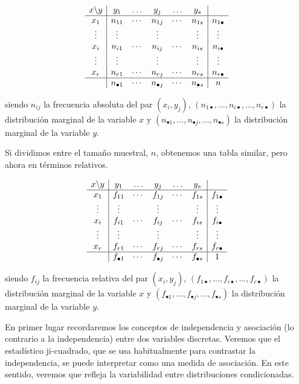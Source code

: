\documentclass[
  a4paper,
  oneside]{scrbook}
\theoremstyle{definition}
\theoremstyle{definition}
\theoremstyle{definition}
\theoremstyle{definition}
\theoremstyle{remark}
\begin{document}
\[\begin{array}{c|ccccc|c}
x\backslash y & y_1 & \ldots & y_j & \ldots & y_s & \\
\hline x_1 & n_{11} & \cdots & n_{1j} & \cdots & n_{1s} & n_{1\bullet} \\
\vdots & \vdots & & \vdots & & \vdots &\vdots \\
x_i & n_{i1} & \cdots & n_{ij} & \cdots & n_{is} & n_{i\bullet} \\
\vdots & \vdots & & \vdots & & \vdots &\vdots \\
x_r & n_{r1} & \cdots & n_{rj} & \cdots & n_{rs} & n_{r\bullet} \\
\hline & n_{\bullet 1} & \cdots & n_{\bullet j} & \cdots & n_{\bullet s} & n \\
\end{array}\]

siendo \(n_{ij}\) la frecuencia absoluta del par \((x_i,y_j)\),
\((n_{1\bullet},\ldots,n_{i\bullet},\ldots,n_{r\bullet})\) la distribución
marginal de la variable \(x\) y
\((n_{\bullet 1},\ldots,n_{\bullet j},\ldots,n_{\bullet s})\) la
distribución marginal de la variable \(y\).

Si dividimos entre el tamaño muestral, \(n\), obtenemos una tabla similar,
pero ahora en términos relativos.

\[\begin{array}{c|ccccc|c}
x\backslash y & y_1 & \ldots & y_j & \ldots & y_s & \\
\hline x_1 & f_{11} & \cdots & f_{1j} & \cdots & f_{1s} & f_{1\bullet} \\
\vdots & \vdots & & \vdots & & \vdots &\vdots \\
x_i & f_{i1} & \cdots & f_{ij} & \cdots & f_{is} & f_{i\bullet} \\
\vdots & \vdots & & \vdots & & \vdots &\vdots \\
x_r & f_{r1} & \cdots & f_{rj} & \cdots & f_{rs} & f_{r\bullet} \\
\hline & f_{\bullet 1} & \cdots & f_{\bullet j} & \cdots & f_{\bullet s} & 1 \\
\end{array}\]

siendo \(f_{ij}\) la frecuencia relativa del par \((x_i,y_j)\),
\((f_{1\bullet},\ldots,f_{i\bullet},\ldots,f_{r\bullet})\) la distribución
marginal de la variable \(x\) y
\((f_{\bullet 1},\ldots,f_{\bullet j},\ldots,f_{\bullet s})\) la
distribución marginal de la variable \(y\).

En primer lugar recordaremos los conceptos de independencia y asociación
(lo contrario a la independencia) entre dos variables discretas. Veremos
que el estadístico ji-cuadrado, que se usa habitualmente para contrastar
la independencia, se puede interpretar como una medida de asociación. En
este sentido, veremos que refleja la variabilidad entre distribuciones
condicionadas.
\end{document}
